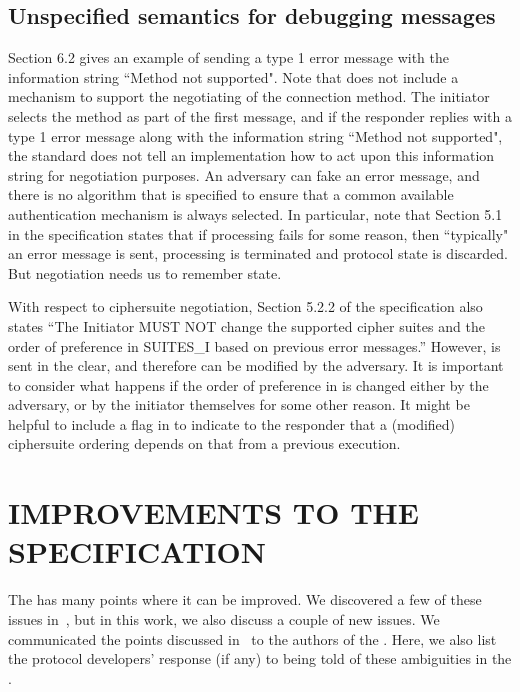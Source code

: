 \documentclass[runningheads]{llncs}
\begin{document}
\subsection{Unspecified semantics for debugging messages}
Section 6.2 gives an example of sending a type 1 error message with the 
information string ``Method not supported".
%
Note that \mEdhoc{} does not include a mechanism to support the 
negotiating of the connection method.
%
The initiator selects the method as part of the first message, and if the 
responder replies with a type 1 error message along with the information 
string ``Method not supported", the standard does not tell an 
implementation how to act upon this information string for negotiation 
purposes.
%
An adversary can fake an error message, and there is no algorithm that is 
specified to ensure that a common available authentication mechanism is 
always selected.
%
In particular, note that Section 5.1 in the specification states that if processing 
fails for some reason, then ``typically" an error message is sent, processing is 
terminated and protocol state is discarded. 
%
But negotiation needs us to remember state.

With respect to ciphersuite negotiation, Section 5.2.2 of the specification also 
states ``The Initiator MUST NOT change the supported cipher suites and
the order of preference in SUITES\_I based on previous error messages.'' 
%
However, \mSuites is sent in the clear, and therefore can be modified by the 
adversary.
%
It is important to consider what happens if the order of preference in 
\mSuites{} is changed either by the adversary, or by the initiator themselves 
for some other reason.
%
It might be helpful to include a flag in \mMsgone{} to indicate to the 
responder
that a (modified) ciphersuite ordering depends on that from a previous
execution.

\section{\uppercase{Improvements to the specification}}
\label{sec:discussion}
The \mEdhoc{} \mSpec{} has many points where it can be improved.
%
We discovered a few of these issues in~\cite{Norr21}, but in this work,
we also discuss a couple of new issues.
%
We communicated the points discussed in~\cite{Norr21} to the authors of the
\mSpec{}.
%
Here, we also list the protocol developers' response (if any) to being told of these
ambiguities in the \mSpec{}.
\end{document}
